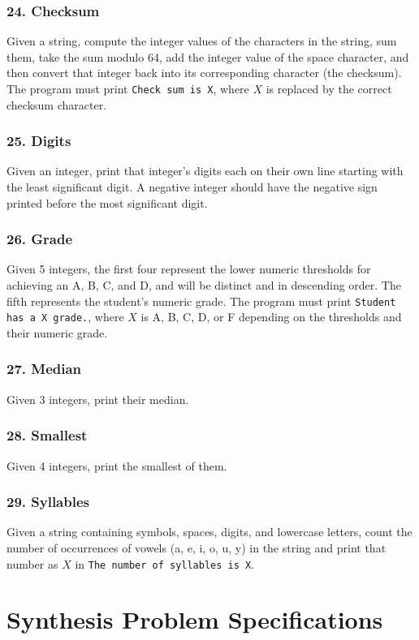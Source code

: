 \documentclass{sig-alternate}
\begin{document}
\subsubsection*{24. Checksum}
Given a string, compute the integer values of the characters in the string, sum them, take the sum modulo 64, add the integer value of the space character, and then convert that integer back into its corresponding character (the checksum). The program must print \texttt{Check sum is X}, where $X$ is replaced by the correct checksum character.

\subsubsection*{25. Digits}
Given an integer, print that integer's digits each on their own line starting with the least significant digit. A negative integer should have the negative sign printed before the most significant digit.

\subsubsection*{26. Grade}
Given 5 integers, the first four represent the lower numeric thresholds for achieving an A, B, C, and D, and will be distinct and in descending order. The fifth represents the student's numeric grade. The program must print \texttt{Student has a X grade.}, where $X$ is A, B, C, D, or F depending on the thresholds and their numeric grade.

\subsubsection*{27. Median}
Given 3 integers, print their median.

\subsubsection*{28. Smallest}
Given 4 integers, print the smallest of them.

\subsubsection*{29. Syllables}
Given a string containing symbols, spaces, digits, and lowercase letters, count the number of occurrences of vowels (a, e, i, o, u, y) in the string and print that number as $X$ in \texttt{The number of syllables is X}.

\section{Synthesis Problem Specifications}
\end{document}
